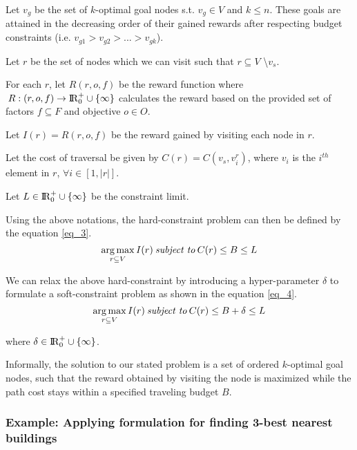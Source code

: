 Let $v_g$ be the set of $k$-optimal goal nodes s.t. $v_g \in V$ and $k \leq n$. These goals are attained in the decreasing order of their gained rewards after respecting budget constraints (i.e. $v_{g1} > v_{g2} > ... > v_{gk}$). 

Let $r$ be the set of nodes which we can visit such that $r \subseteq V$ \textbackslash\:$v_s$. 


For each $r$, let $R(r, o, f)$ be the reward function where $\:R:(r,o,f) \rightarrow {\rm I\!R}_0^+ \cup \{\infty\}$ calculates the reward based on the provided set of factors $f \subseteq F$ and objective $o \in O$. 

Let $I(r) = R(r,o,f)$ be the reward gained by visiting each node in $r$. 

Let the cost of traversal be given by $C(r) = C(v_s, v_i^r)$, where $v_i$ is the $i^{th}$ element in $r$, $\forall i \in [1,|r|]$. 

Let $L \in {\rm I\!R}_0^+ \cup \{\infty\}$ be the constraint limit. 

Using the above notations, the hard-constraint problem can then be defined by the equation \ref{eq_3}.
\begin{equation} \label{eq_3}
    \operatorname*{arg\,max}_{r \subseteq V}I(r) \:\textit{subject to}\:C(r) \leq B \leq L
\end{equation}

We can relax the above hard-constraint by introducing a hyper-parameter $\delta$ to formulate a soft-constraint problem as shown in the equation \ref{eq_4}.
\begin{equation} \label{eq_4}
    \operatorname*{arg\,max}_{r \subseteq V}I(r) \:\textit{subject to}\: C(r) \leq B+\delta \leq L
\end{equation}

where $\delta \in {\rm I\!R}_0^+ \cup \{\infty\}$.

Informally, the solution to our stated problem is a set of ordered $k$-optimal goal nodes, such that the reward obtained by visiting the node is maximized while the path cost stays within a specified traveling budget $B$.

\subsubsection{Example: Applying formulation for finding 3-best nearest buildings} \label{example_1}

